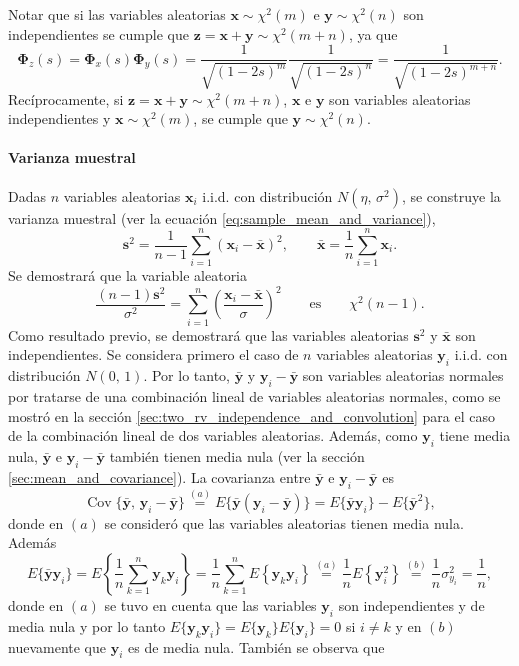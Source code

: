 \documentclass[a4paper]{report}
\newcommand{\x}{\mathbf{x}}
\newcommand{\y}{\mathbf{y}}
\newcommand{\z}{\mathbf{z}}
\newcommand{\Phibf}{\mathbf{\Phi}}
\begin{document}
Notar que si las variables aleatorias \(\x\sim\chi^2(m)\) e \(\y\sim\chi^2(n)\) son independientes se cumple que \(\z=\x+\y\sim\chi^2(m+n)\), ya que
\[
 \Phibf_z(s)=\Phibf_x(s)\Phibf_y(s)=\frac{1}{\sqrt{(1-2s)^m}}\frac{1}{\sqrt{(1-2s)^n}}=\frac{1}{\sqrt{(1-2s)^{m+n}}}.
\]
Recíprocamente, si \(\z=\x+\y\sim\chi^2(m+n)\), \(\x\) e \(\y\) son variables aleatorias independientes y \(\x\sim\chi^2(m)\), se cumple que \(\y\sim\chi^2(n)\).

\paragraph{Varianza muestral}

Dadas \(n\) variables aleatorias \(\x_i\) i.i.d. con distribución \(N(\eta,\,\sigma^2)\), se construye la varianza muestral (ver la ecuación \ref{eq:sample_mean_and_variance}),
\[
 \mathbf{s}^2=\frac{1}{n-1}\sum_{i=1}^{n}(\x_i-\bar{\x})^2,\qquad \bar{\x}=\frac{1}{n}\sum_{i=1}^{n}\x_i.
\]
Se demostrará que la variable aleatoria
\begin{equation}\label{eq:normal_sample_variance_density}
 \frac{(n-1)\mathbf{s}^2}{\sigma^2}=\sum_{i=1}^{n}\left(\frac{\x_i-\bar{\x}}{\sigma}\right)^2\qquad\textrm{es}\qquad\chi^2(n-1).
\end{equation}
Como resultado previo, se demostrará que las variables aleatorias \(\mathbf{s}^2\) y \(\bar{\x}\) son independientes. Se considera primero el caso de \(n\) variables aleatorias \(\y_i\) i.i.d. con distribución \(N(0,\,1)\). Por lo tanto, \(\bar{\y}\) y \(\y_i-\bar{\y}\) son variables aleatorias normales por tratarse de una combinación lineal de variables aleatorias normales, como se mostró en la sección \ref{sec:two_rv_independence_and_convolution} para el caso de la combinación lineal de dos variables aleatorias. Además, como \(\y_i\) tiene media nula, \(\bar{\y}\) e \(\y_i-\bar{\y}\) también tienen media nula (ver la sección \ref{sec:mean_and_covariance}). La covarianza entre \(\bar{\y}\) e \(\y_i-\bar{\y}\) es
\[
 \operatorname{Cov}\{\bar{\y},\,\y_i-\bar{\y}\}\overset{(a)}{=}E\{\bar{\y}(\y_i-\bar{\y})\}=E\{\bar{\y}\y_i\}-E\{{\bar{\y}}^2\},
\]
donde en \((a)\) se consideró que las variables aleatorias tienen media nula. Además
\[
 E\{\bar{\y}\y_i\}=E\left\{\frac{1}{n}\sum_{k=1}^n\y_k\y_i\right\}
 =\frac{1}{n}\sum_{k=1}^nE\left\{\y_k\y_i\right\}
 \overset{(a)}{=}\frac{1}{n}E\left\{\y_i^2\right\}
 \overset{(b)}{=}\frac{1}{n}\sigma^2_{y_i}
 =\frac{1}{n},
\]
donde en \((a)\) se tuvo en cuenta que las variables \(\y_i\) son independientes y de media nula y por lo tanto \(E\{\y_k\y_i\}=E\{\y_k\}E\{\y_i\}=0\) si \(i\neq k\) y en \((b)\) nuevamente que \(\y_i\) es de media nula. También se observa que
\end{document}
